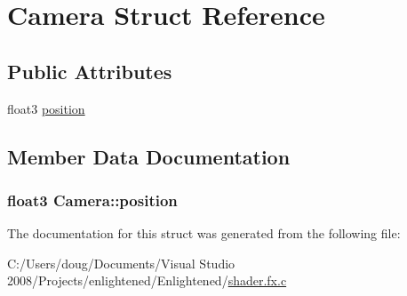 \hypertarget{struct_camera}{
\section{Camera Struct Reference}
\label{struct_camera}
}
\subsection*{Public Attributes}
\begin{DoxyCompactItemize}
\item 
float3 \hyperlink{struct_camera_a2f80b5ae836afb019f838c057859db0a}{position}
\end{DoxyCompactItemize}


\subsection{Member Data Documentation}
\hypertarget{struct_camera_a2f80b5ae836afb019f838c057859db0a}{
\subsubsection[{position}]{\setlength{\rightskip}{0pt plus 5cm}float3 {\bf Camera::position}}}
\label{struct_camera_a2f80b5ae836afb019f838c057859db0a}


The documentation for this struct was generated from the following file:\begin{DoxyCompactItemize}
\item 
C:/Users/doug/Documents/Visual Studio 2008/Projects/enlightened/Enlightened/\hyperlink{shader_8fx_8c}{shader.fx.c}\end{DoxyCompactItemize}

